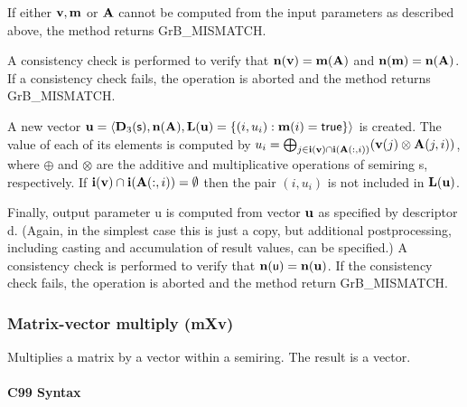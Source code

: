 \documentclass[11pt]{extarticle}
\begin{document}
If either ${\bf v}, {\bf m}$ or ${\bf A}$ cannot be computed
from the input parameters as described above, the method returns {\sf
GrB\_MISMATCH}.

A consistency check is performed to verify that $\bold{n}({\bf v})
= \bold{m}({\bf A})$ and $\bold{n}({\bf m}) =
\bold{n}({\bf A})$. If a consistency check fails, the operation is
aborted and the method returns {\sf GrB\_MISMATCH}.

A new vector ${\bf u} = \langle \bold{D}_3({\sf s}),
\bold{n}({\bf A}), \bold{L}({\bf u}) = \{(i,u_i) : {\bf m}(i)
= {\sf true} \} \rangle$ is created.  The value of each of its elements
is computed by $u_i = \bigoplus_{j \in {\bf i}({\bf v}) \cap
{\bf i}({\bf A}(:,i))} ({\bf v}(j) \otimes {\bf A}(j,i))$,
where $\oplus$ and $\otimes$ are the additive and multiplicative
operations of semiring {\sf s}, respectively.  If ${\bf i}({\bf v})
\cap {\bf i}({\bf A}(:,i)) = \emptyset$ then the pair $(i,u_i)$
is not included in $\bold{L}({\bf u})$.

Finally, output parameter {\sf u} is computed from vector ${\bf u}$
as specified by descriptor {\sf d}. (Again, in the simplest case this
is just a copy, but additional postprocessing, including casting and
accumulation of result values, can be specified.)  A consistency check is
performed to verify that $\bold{n}({\sf u}) = \bold{n}({\bf u})$. If
the consistency check fails, the operation is aborted and the method
return {\sf GrB\_MISMATCH}.

 

 

\subsubsection{Matrix-vector multiply ({\sf mXv})}

Multiplies a matrix by a vector within a semiring. The result is a vector.

\paragraph{C99 Syntax}
\end{document}
